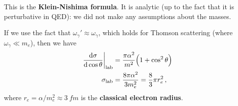 \documentclass[main.tex]{subfiles}
\begin{document}
This is the \textbf{Klein-Nishima formula}. It is analytic (up to the fact that it is perturbative in QED): we did not make any assumptions about the masses. 

If we use the fact that \(\omega_{\gamma }' \approx \omega_{\gamma } \), which holds for Thomson scattering (where \(\omega_{\gamma } \ll m_e \)), then we have 
%
\begin{align}
\eval{\dv{\sigma }{\cos \theta }}_{\text{lab}} &= \frac{\pi \alpha^2}{m^2}
\qty( 1 + \cos^2 \theta )  \\
\sigma _{\text{lab}} &= \frac{8 \pi \alpha^2}{3 m_e^2} = \frac{8}{3} \pi r_e^2
\,,
\end{align}
%
where \(r_e = \alpha / m_e^2 \approx \SI{3}{fm}\) is the \textbf{classical electron radius}. 
\end{document}
